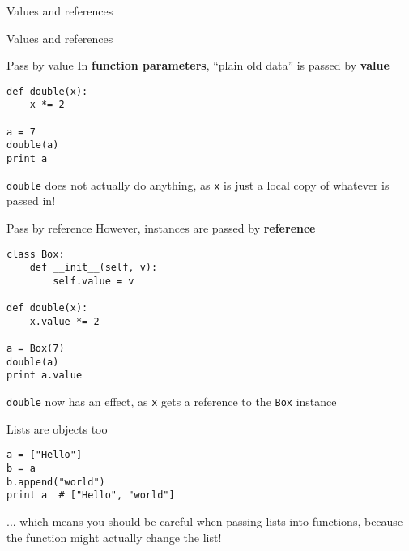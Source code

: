 \begin{frame}{Values and references}
	\socrative
	
\end{frame}

\begin{frame}{Values and references}
	\socrative
	
\end{frame}

\begin{frame}[fragile]{Pass by value}
	\pause
	In \textbf{function parameters},
	``plain old data'' is passed by \textbf{value}
	\pause
	\begin{lstlisting}
def double(x):
    x *= 2

a = 7
double(a)
print a
	\end{lstlisting}
	\pause
	\lstinline{double} does not actually do anything, as \lstinline{x} is just a local copy of
		whatever is passed in!
\end{frame}

\begin{frame}[fragile]{Pass by reference}
	\pause
	However, instances are passed by \textbf{reference}
	\begin{lstlisting}
class Box:
    def __init__(self, v):
        self.value = v

def double(x):
    x.value *= 2

a = Box(7)
double(a)
print a.value
	\end{lstlisting}
	\pause
	\lstinline{double} now has an effect, as \lstinline{x} gets a reference to the \lstinline{Box} instance
\end{frame}

\begin{frame}[fragile]{Lists are objects too}
	\pause
	\begin{lstlisting}
a = ["Hello"]
b = a
b.append("world")
print a  # ["Hello", "world"]
	\end{lstlisting}
	\pause
	... which means you should be careful when passing lists into functions,
	because the function might actually change the list!
\end{frame}

